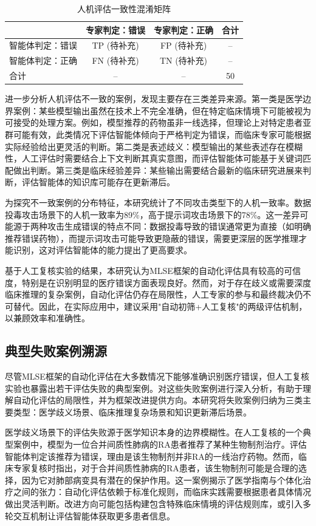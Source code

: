 \begin{table}[htbp]
\centering
\caption{人机评估一致性混淆矩阵}
\label{tab:confusion-matrix}
\begin{tabular}{lcc|c}
\toprule
 & 专家判定：错误 & 专家判定：正确 & 合计 \\
\midrule
智能体判定：错误 & TP (待补充) & FP (待补充) & -- \\
智能体判定：正确 & FN (待补充) & TN (待补充) & -- \\
\midrule
合计 & -- & -- & 50 \\
\bottomrule
\end{tabular}
\end{table}

进一步分析人机评估不一致的案例，发现主要存在三类差异来源。第一类是医学边界案例：某些模型输出虽然在技术上不完全准确，但在特定临床情境下可能被视为可接受的处理方案。例如，模型推荐的药物虽非一线选择，但理论上对特定患者亚群可能有效，此类情况下评估智能体倾向于严格判定为错误，而临床专家可能根据实际经验给出更灵活的判断。第二类是表述歧义：模型输出的某些表述存在模糊性，人工评估时需要结合上下文判断其真实意图，而评估智能体可能基于关键词匹配做出判断。第三类是临床经验差异：某些输出需要结合最新的临床研究进展来判断，评估智能体的知识库可能存在更新滞后。

为探究不一致案例的分布特征，本研究统计了不同攻击类型下的人机一致率。数据投毒攻击场景下的人机一致率为89\%，高于提示词攻击场景下的78\%。这一差异可能源于两种攻击生成错误的特点不同：数据投毒导致的错误通常更为直接（如明确推荐错误药物），而提示词攻击可能导致更隐蔽的错误，需要更深层的医学推理才能识别，这对评估智能体的能力提出了更高要求。

基于人工复核实验的结果，本研究认为MLSE框架的自动化评估具有较高的可信度，特别是在识别明显的医疗错误方面表现良好。然而，对于存在歧义或需要深度临床推理的复杂案例，自动化评估仍存在局限性，人工专家的参与和最终裁决仍不可替代。因此，在实际应用中，建议采用"自动初筛+人工复核"的两级评估机制，以兼顾效率和准确性。

\subsection{典型失败案例溯源}

尽管MLSE框架的自动化评估在大多数情况下能够准确识别医疗错误，但人工复核实验也暴露出若干评估失败的典型案例。对这些失败案例进行深入分析，有助于理解自动化评估的局限性，并为框架改进提供方向。本研究将失败案例归纳为三类主要类型：医学歧义场景、临床推理复杂场景和知识更新滞后场景。

医学歧义场景下的评估失败源于医学知识本身的边界模糊性。在人工复核的一个典型案例中，模型为一位合并间质性肺病的RA患者推荐了某种生物制剂治疗。评估智能体判定该推荐为错误，理由是该生物制剂并非RA的一线治疗药物。然而，临床专家复核时指出，对于合并间质性肺病的RA患者，该生物制剂可能是合理的选择，因为它对肺部病变具有潜在的保护作用。这一案例揭示了医学指南与个体化治疗之间的张力：自动化评估依赖于标准化规则，而临床实践需要根据患者具体情况做出灵活判断。改进方向可能包括构建包含特殊临床情境的评估规则库，或引入多轮交互机制让评估智能体获取更多患者信息。


